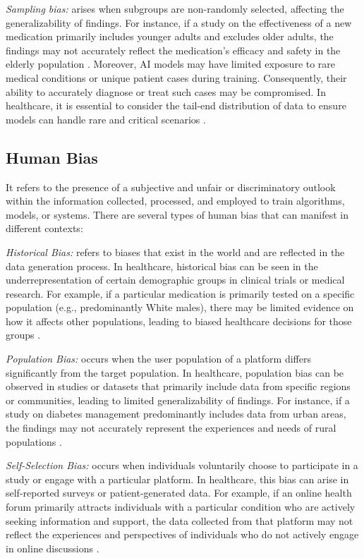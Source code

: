 \documentclass{article}
\begin{document}
\emph{Sampling bias:} arises when subgroups are non-randomly selected, affecting the generalizability of findings. For instance, if a study on the effectiveness of a new medication primarily includes younger adults and excludes older adults, the findings may not accurately reflect the medication's efficacy and safety in the elderly population \cite{anderson2011species,oommen2011sampling}. 
Moreover, AI models may have limited exposure to rare medical conditions or unique patient cases during training. Consequently, their ability to accurately diagnose or treat such cases may be compromised. In healthcare, it is essential to consider the tail-end distribution of data to ensure models can handle rare and critical scenarios \cite{cole2011reducing}.


\subsection{Human Bias}
It refers to the presence of a subjective and unfair or discriminatory outlook within the information collected, processed, and employed to train algorithms, models, or systems. There are several types of human bias that can manifest in different contexts:

\emph{Historical Bias:} refers to biases that exist in the world and are reflected in the data generation process. In healthcare, historical bias can be seen in the underrepresentation of certain demographic groups in clinical trials or medical research. For example, if a particular medication is primarily tested on a specific population (e.g., predominantly White males), there may be limited evidence on how it affects other populations, leading to biased healthcare decisions for those groups \cite{suresh2021framework}.

\emph{Population Bias:} occurs when the user population of a platform differs significantly from the target population. In healthcare, population bias can be observed in studies or datasets that primarily include data from specific regions or communities, leading to limited generalizability of findings. For instance, if a study on diabetes management predominantly includes data from urban areas, the findings may not accurately represent the experiences and needs of rural populations \cite{olteanu2019social}.

\emph{Self-Selection Bias:} occurs when individuals voluntarily choose to participate in a study or engage with a particular platform. In healthcare, this bias can arise in self-reported surveys or patient-generated data. For example, if an online health forum primarily attracts individuals with a particular condition who are actively seeking information and support, the data collected from that platform may not reflect the experiences and perspectives of individuals who do not actively engage in online discussions \cite{ogge2022maternal}.
\end{document}
